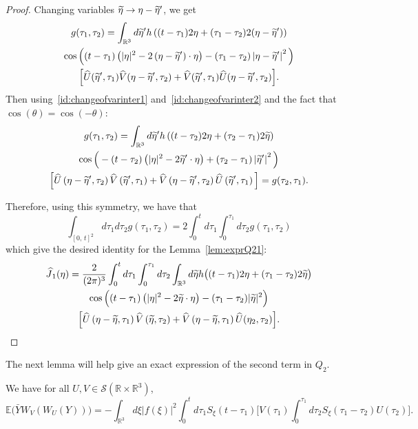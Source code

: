 \documentclass[AHL, Unicode, longabstracts,published]{cedram}
\newcommand{\R}{\mathbb{R}}
\newcommand{\E}{\mathbb{E}}
\newcommand{\mclS}{\mathcal{S}}
\let\oldtilde\tilde
\renewcommand*{\tilde}[1]{\mathchoice{\widetilde{#1}}{\widetilde{#1}}{\oldtilde{#1}}{\oldtilde{#1}}}
\let\oldhat\hat
\renewcommand*{\hat}[1]{\mathchoice{\widehat{#1}}{\widehat{#1}}{\oldhat{#1}}{\oldhat{#1}}}
\begin{document}
\begin{proof}
Changing variables $\tilde \eta \rightarrow \eta-\tilde \eta'$, we get
\begin{multline*}
g(\tau_1,\tau_2) = 
\int_{\R^3} d\tilde{\eta}' h\left((t-\tau_1)2\eta + (\tau_1-\tau_2) 2(\eta-\tilde{\eta}')\right)\\ \cos\Big((t-\tau_1)\left(|\eta|^2-2\left(\eta-\tilde{\eta}'\right)\cdot \eta\right)-(\tau_1-\tau_2)\left|\eta-\tilde{\eta}'\right|^2 \Big)\\
\Big[\hat U(\tilde{\eta}',\tau_1) \hat V(\eta-\tilde{\eta}',\tau_2)+ \hat V(\tilde{\eta}',\tau_1) \hat U(\eta-\tilde{\eta}',\tau_2)\Big].
\end{multline*}
Then using~\eqref{id:changeofvarinter1} and~\eqref{id:changeofvarinter2} and the fact that $\cos (\theta)=\cos(-\theta)$:
\begin{multline*}
g(\tau_1,\tau_2) = \int_{\R^3} d\tilde{\eta}' h\left((t-\tau_2)2\eta + (\tau_2-\tau_1) 2\tilde{\eta}\right)\\
\cos\Big(-(t-\tau_2)\left(|\eta|^2-2\tilde{\eta}'\cdot \eta\right)+(\tau_2-\tau_1)\left|\tilde{\eta}'\right|^2 \Big)\\
\Big[\hat U\left(\eta-\tilde{\eta}',\tau_2\right) \hat V\left(\tilde{\eta}',\tau_1\right)+ \hat V\left(\eta-\tilde{\eta}',\tau_2\right) \hat U\left(\tilde{\eta}',\tau_1\right)\Big]
=g(\tau_2,\tau_1).
\end{multline*}

Therefore, using this symmetry, we have that
\[
\int_{[0,\,t]^2}d\tau_1d\tau_2 g(\tau_1,\tau_2)=2\int_0^td\tau_1\int_0^{\tau_1}d\tau_2 g(\tau_1,\tau_2)
\]
which give the desired identity for the Lemma~\ref{lem:exprQ21}:
\begin{multline*}
\hat J_1(\eta) =
 \frac{2}{(2\pi)^3}\int_{0}^td\tau_1 \int_{0}^{\tau_1}d\tau_2 \int_{\R^3} d\tilde{\eta} h\big((t-\tau_1)2\eta + (\tau_1-\tau_2) 2\tilde{\eta}\big)\\
 \cos\Big((t-\tau_1)\left(|\eta|^2-2\tilde{\eta}\cdot \eta\right)-(\tau_1-\tau_2)|\tilde{\eta}|^2 \Big)\\
\Big[\hat U\left(\eta-\tilde{\eta},\tau_1\right) \hat V\left(\tilde{\eta},\tau_2\right)+ \hat V\left(\eta-\tilde{\eta},\tau_1\right) \hat U(\eta_2,\tau_2)\Big].
\end{multline*}
\end{proof}


The next lemma will help give an exact expression of the second term in $Q_2$.


\begin{lemm}\label{lem:expressionWVWU}
We have for all $U,V \in \mclS(\R\times \R^3)$,
\[
\E\Big(\bar Y W_V\left(W_U(Y)\right)\Big) = - \int_{\R^3} d\xi |f(\xi)|^2 \int_{0}^t d\tau_1 S_\xi (t-\tau_1)\Big[V(\tau_1) \int_{0}^{\tau_1} d\tau_2 S_\xi (\tau_1 - \tau_2) U (\tau_2) \Big].
\]
\end{lemm}
\end{document}
